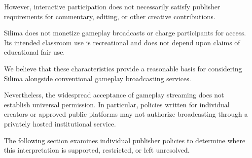 However, interactive participation does not necessarily
satisfy publisher requirements for commentary, editing,
or other creative contributions.

Silima does not monetize gameplay broadcasts or charge
participants for access. Its intended classroom use
is recreational and does not depend upon claims of
educational fair use.

We believe that these characteristics provide a
reasonable basis for considering Silima alongside
conventional gameplay broadcasting services.

Nevertheless, the widespread acceptance of gameplay
streaming does not establish universal permission.
In particular, policies written for individual creators
or approved public platforms may not authorize
broadcasting through a privately hosted institutional
service.

The following section examines individual publisher
policies to determine where this interpretation is
supported, restricted, or left unresolved.

